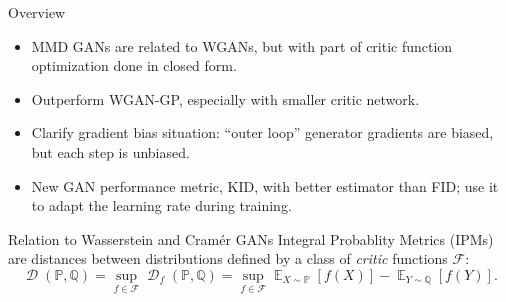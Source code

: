 \documentclass[xcolor={table}]{beamer}
\DeclareMathOperator{\D}{\mathcal{D}}
\DeclareMathOperator*{\E}{\mathbb{E}}
\newcommand{\F}{\mathcal{F}}
\newcommand{\PP}{\mathbb P}
\newcommand{\QQ}{\mathbb Q}
\begin{document}
\begin{frame}{}
\maketitle
\begin{columns}[T, totalwidth=\textwidth]

  \begin{column}{.32\textwidth}
    \begin{alertblock}{\;Overview}
      \begin{itemize}\raggedright
        \item MMD GANs are related to WGANs, but with part of critic function optimization done in closed form.
        \item Outperform WGAN-GP, especially with smaller critic network.
        \item Clarify gradient bias situation:
              ``outer loop'' generator gradients are biased,
              but each step is unbiased.
        \item New GAN performance metric, KID, with better estimator than FID;
              use it to adapt the learning rate during training.
      \end{itemize}
    \end{alertblock}
    \begin{block}{Relation to Wasserstein and Cram\'er GANs}
      Integral Probablity Metrics (IPMs) %
      are distances between distributions
      defined by a class of \emph{critic} functions $\F$:
      \[
        \D(\PP, \QQ)
        = \sup_{f \in \F} \D_f(\PP, \QQ)
        = \sup_{f\in\F} \E_{X\sim\PP}[f(X)] - \E_{Y\sim\QQ}[f(Y)].
      \]


\end{block}
\end{column}
\end{columns}
\end{frame}
\end{document}
